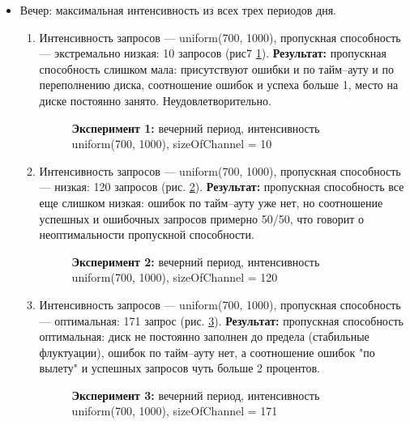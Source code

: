 \begin{itemize}
    \item Вечер: максимальная интенсивность из всех трех периодов дня.
     \begin{enumerate}
        \item Интенсивность запросов --- uniform(700, 1000), пропускная способность --- экстремально низкая:
        10 запросов (рис7 \ref{evn1}). \textbf{Результат:} пропускная способность слишком мала: присутствуют
        ошибки и по тайм--ауту и по переполнению диска, соотношение ошибок и успеха больше 1, место на диске
        постоянно занято. Неудовлетворительно.
        \begin{figure} [h]
            \caption{\textbf{Эксперимент 1:} вечерний период, интенсивность uniform(700, 1000), sizeOfChannel = 10}
            \label{evn1}
        \end{figure}

        \item Интенсивность запросов --- uniform(700, 1000), пропускная способность --- низкая:
        120 запросов (рис. \ref{evn2}). \textbf{Результат:} пропускная способность все еще слишком низкая:
        ошибок по тайм--ауту уже нет, но соотношение успешных и ошибочных запросов примерно 50/50, что
        говорит о неоптимальности пропускной способности.
        \begin{figure} [h]
            \caption{\textbf{Эксперимент 2:} вечерний период, интенсивность uniform(700, 1000), sizeOfChannel = 120}
            \label{evn2}
        \end{figure}

        \item Интенсивность запросов --- uniform(700, 1000), пропускная способность --- оптимальная:
        171 запрос (рис. \ref{evn3}). \textbf{Результат:} пропускная способность оптимальная: диск не постоянно
        заполнен до предела (стабильные флуктуации), ошибок по тайм--ауту нет, а соотношение ошибок "по вылету"
        и успешных запросов чуть больше 2 процентов.
        \begin{figure} [h]
            \caption{\textbf{Эксперимент 3:} вечерний период, интенсивность uniform(700, 1000), sizeOfChannel = 171}
            \label{evn3}
        \end{figure}


\end{enumerate}
\end{itemize}
